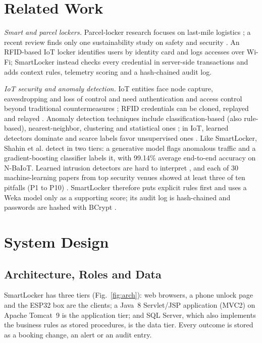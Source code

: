 \documentclass[sigconf,screen]{acmart}
\begin{document}
\section{Related Work}

\textit{Smart and parcel lockers.} Parcel-locker research focuses on last-mile logistics \cite{iwan2016parcel}; a
recent review finds only one sustainability study on safety and security \cite{zhang2025parcel}. An RFID-based IoT locker
\cite{rfidiot2023locker} identifies users by identity card and logs accesses over Wi-Fi; SmartLocker instead checks
every credential in server-side transactions and adds context rules, telemetry scoring and a hash-chained audit log.

\textit{IoT security and anomaly detection.} IoT entities face node capture, eavesdropping and loss of control
\cite{roman2013features} and need authentication and access control beyond traditional countermeasures
\cite{sicari2015security}; RFID credentials can be cloned, replayed and relayed \cite{mitrokotsa2010rfid}. Anomaly
detection techniques include classification-based (also rule-based), nearest-neighbor, clustering and statistical ones
\cite{chandola2009anomaly}; in IoT, learned detectors dominate and scarce labels favor unsupervised ones
\cite{demedeiros2023anomaly}. Like SmartLocker, Shahin et al. \cite{shahin2025twostage} detect in two tiers: a generative model flags
anomalous traffic and a gradient-boosting classifier labels it, with 99.14\% average end-to-end accuracy on N-BaIoT.
Learned intrusion detectors are hard to interpret \cite{sommer2010outside}, and each of 30 machine-learning papers from
top security venues showed at least three of ten pitfalls (P1 to P10) \cite{arp2022dos}. SmartLocker therefore puts
explicit rules first and uses a Weka model \cite{hall2009weka} only as a supporting score; its audit log is
hash-chained \cite{haber1991timestamp} and passwords are hashed with BCrypt \cite{provos1999bcrypt}.

\section{System Design}\label{sec:design}

\subsection{Architecture, Roles and Data}

SmartLocker has three tiers (Fig.~\ref{fig:arch}): web browsers, a phone unlock page and the ESP32 box are the
clients; a Java~8 Servlet/JSP application (MVC2) on Apache Tomcat~9 is the application tier; and SQL Server, which
also implements the business rules as stored procedures, is the data tier. Every outcome is stored as a booking
change, an alert or an audit entry.
\end{document}
